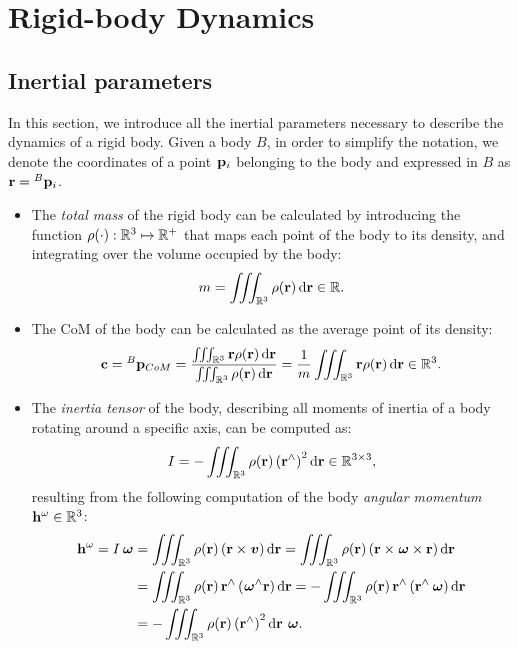 \section{Rigid-body Dynamics}

\subsection{Inertial parameters}

In this section, we introduce all the inertial parameters necessary to describe the dynamics of a rigid body.
Given a body $B$, in order to simplify the notation, we denote the coordinates of a point $\pos_i$ belonging to the body and expressed in $B$ as $\mathbf{r} = \pos[B]_i$.

\begin{itemize}
%
\item
The \emph{total mass} of the rigid body can be calculated by introducing the function $\rho(\cdot): \realn^3 \mapsto \realn^+$ that maps each point of the body to its density, and integrating over the volume occupied by the body:
%
\begin{equation*}
    m = \iiint_{\realn^3} \rho(\mathbf{r}) \dd{\mathbf{r}}
    \in \realn
    .
\end{equation*}

\item
The \ac{CoM} of the body can be calculated as the average point of its density:
%
\begin{equation}
    \label{eq:com_definition}
    \mathbf{c} = \pos[B]_{CoM} =
    \frac{\iiint_{\realn^3} \mathbf{r} \rho(\mathbf{r}) \dd{\mathbf{r}}}{\iiint_{\realn^3} \rho(\mathbf{r}) \dd{\mathbf{r}}}
    = \frac{1}{m} \iiint_{\realn^3} \mathbf{r} \rho(\mathbf{r}) \dd{\mathbf{r}}
    \in \realn^3
    .
\end{equation}

\item
The \emph{inertia tensor} of the body, describing all moments of inertia of a body rotating around a specific axis, can be computed as:
%
\begin{equation*}
   I = -\iiint_{\realn^3} \rho(\mathbf{r}) \left( \mathbf{r}^\wedge \right)^2 \dd{\mathbf{r}}
   \in \realn^{3\times3}
   ,
\end{equation*}
%
resulting from the following computation of the body \emph{angular momentum} $\mathbf{h}^\omega \in \realn^3$:
%
\begin{align*}
    \mathbf{h}^\omega = I \velang
    &= \iiint_{\realn^3} \rho(\mathbf{r}) \left( \mathbf{r} \times \vellin \right) \dd{\mathbf{r}}
    = \iiint_{\realn^3} \rho(\mathbf{r}) \left( \mathbf{r} \times \velang \times \mathbf{r} \right) \dd{\mathbf{r}} \\
    &= \iiint_{\realn^3} \rho(\mathbf{r}) \, \mathbf{r}^\wedge \left( \velang^\wedge \mathbf{r} \right) \dd{\mathbf{r}}
    = -\iiint_{\realn^3} \rho(\mathbf{r}) \, \mathbf{r}^\wedge \left( \mathbf{r}^\wedge \velang \right) \dd{\mathbf{r}} \\
    &= -\iiint_{\realn^3} \rho(\mathbf{r}) \left( \mathbf{r}^\wedge \right)^2 \dd{\mathbf{r}} \, \velang
    .
\end{align*}


\end{itemize}
